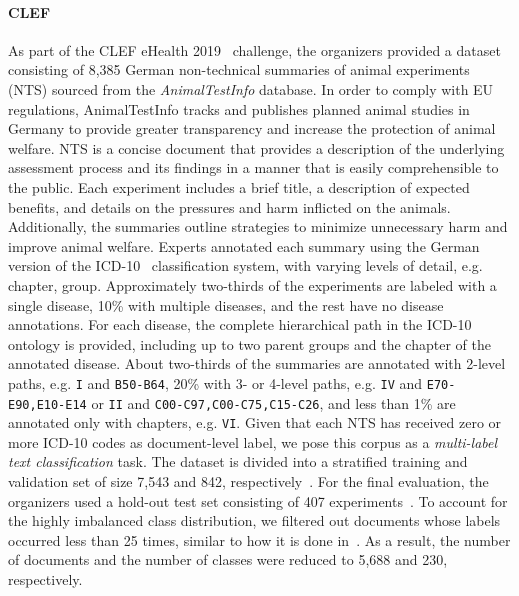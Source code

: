 \paragraph{CLEF}
As part of the CLEF eHealth 2019~\cite{crestani2019experimental} challenge, the
organizers provided a dataset consisting of 8,385 German non-technical summaries
of animal experiments (NTS) sourced from the \textit{AnimalTestInfo}
\cite{animaltestinfo} database. In order to comply with EU regulations,
AnimalTestInfo tracks and publishes planned animal studies in Germany to provide
greater transparency and increase the protection of animal welfare. NTS is a
concise document that provides a description of the underlying assessment
process and its findings in a manner that is easily comprehensible to the
public. Each experiment includes a brief title, a description of expected
benefits, and details on the pressures and harm inflicted on the animals.
Additionally, the summaries outline strategies to minimize unnecessary harm and
improve animal welfare. Experts annotated each summary using the German version
of the ICD-10~\cite{graubner2013icd} classification system, with varying levels
of detail, e.g. chapter, group. Approximately two-thirds of the experiments are
labeled with a single disease, 10\% with multiple diseases, and the rest have no
disease annotations. For each disease, the complete hierarchical path in the
ICD-10 ontology is provided, including up to two parent groups and the chapter
of the annotated disease. About two-thirds of the summaries are annotated with
2-level paths, e.g. \texttt{I} and \texttt{B50-B64}, 20\% with 3- or 4-level
paths, e.g. \texttt{IV} and \texttt{E70-E90,E10-E14} or \texttt{II} and
\texttt{C00-C97,C00-C75,C15-C26}, and less than 1\% are annotated only with
chapters, e.g. \texttt{VI}. Given that each NTS has received zero or more ICD-10
codes as document-level label, we pose this corpus as a \textit{multi-label text
classification} task. The dataset is divided into a stratified training and
validation set of size 7,543 and 842, respectively~\cite{clef2019nts}. For the
final evaluation, the organizers used a hold-out test set consisting of 407
experiments~\cite{clef2019test}. To account for the highly imbalanced class
distribution, we filtered out documents whose labels occurred less than 25
times, similar to how it is done in~\cite{lentzen2022critical}. As a result, the
number of documents and the number of classes were reduced to 5,688 and 230,
respectively.

